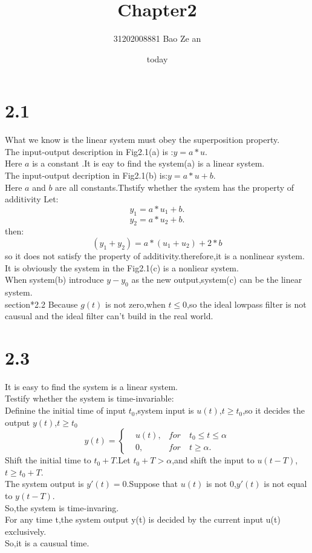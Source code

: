 \documentclass{article}
\title{Chapter2}
\author{31202008881        \quad \quad \quad
          Bao Ze an}
\date{today}
\begin{document}
\maketitle
\section*{2.1}
What we know is the linear system must obey the superposition property.\\
The input-output description in Fig2.1(a) is :$y=a*u$.\\
Here $a$ is a constant .It is eay to find the system(a) is a linear system.\\
The input-output decription in Fig2.1(b) is:$y=a*u+b$.\\
Here $a$ and $b$ are all constants.Thstify whether the system has the property of additivity
Let:
\[y_1=a*u_1+b.\]
\[y_2=a*u_2+b.\]
then:
\[(y_1+y_2)=a*(u_1+u_2)+2*b\]
so it does not satisfy the property of additivity.therefore,it is a nonlinear system.\\
It is obviously the system in the Fig2.1(c) is a nonliear system.\\
When system(b) introduce $y-y_0$ as the new output,system(c) can be the linear system.\\

section*{2.2}
Because $g(t)$ is not zero,when $t \leq 0$,so the ideal lowpass filter is not causual and the ideal filter 
can't build in the real world.\\

\section*{2.3}
It is easy to find the system is a linear system.\\
Testify whether the system is time-invariable:\\
Definine the initial time of input $t_0$,system input is $u(t)$,$t \geq t_0$,so it decides the output $y(t)$,$t \geq t_0$ \\
\[y(t)=\left\{
\begin{aligned}
&u(t)  , &for \quad t_0 \leq t \leq \alpha \\
&0  , &for \quad t \geq \alpha.
\end{aligned}
\right.\]
Shift the initial time to $t_0+T$.Let $t_0+T> \alpha$,and shift the input to $u(t-T)$,$t \geq t_0+T$.\\
The system output is $y'(t)=0$.Suppose that $u(t)$ is not 0,$y'(t)$ is not equal to $y(t-T)$.\\
So,the system is time-invaring.\\
For any time t,the system output y(t) is decided by the current input u(t) exclusively.\\
So,it is a causual time.\\
\end{document}
